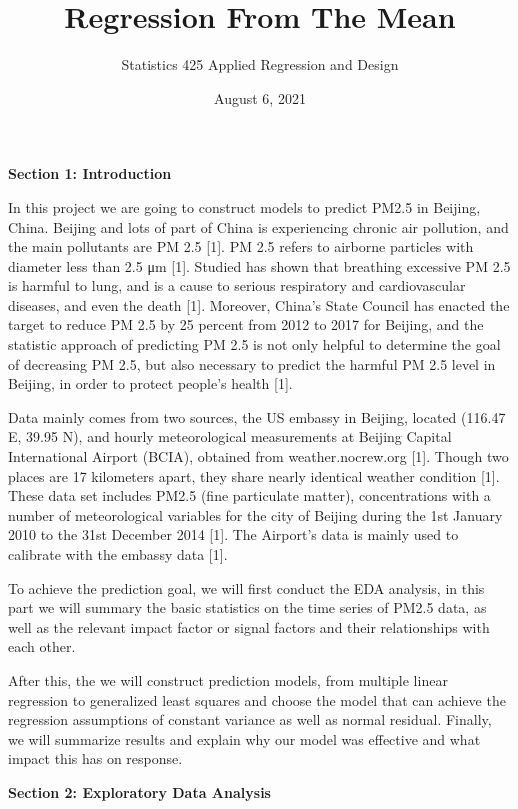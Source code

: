 \documentclass[
]{report}
\title{Regression From The Mean}
\subtitle{by

Zhengtao Xu, Jennings Cheng and Collin Carmichael}
\author{Statistics 425 Applied Regression and Design}
\date{August 6, 2021}
\begin{document}
\maketitle

\newpage

\textbf{Section 1: Introduction}

In this project we are going to construct models to predict PM2.5 in
Beijing, China. Beijing and lots of part of China is experiencing
chronic air pollution, and the main pollutants are PM 2.5 {[}1{]}. PM
2.5 refers to airborne particles with diameter less than 2.5 μm {[}1{]}.
Studied has shown that breathing excessive PM 2.5 is harmful to lung,
and is a cause to serious respiratory and cardiovascular diseases, and
even the death {[}1{]}. Moreover, China's State Council has enacted the
target to reduce PM 2.5 by 25 percent from 2012 to 2017 for Beijing, and
the statistic approach of predicting PM 2.5 is not only helpful to
determine the goal of decreasing PM 2.5, but also necessary to predict
the harmful PM 2.5 level in Beijing, in order to protect people's health
{[}1{]}.

Data mainly comes from two sources, the US embassy in Beijing, located
(116.47 E, 39.95 N), and hourly meteorological measurements at Beijing
Capital International Airport (BCIA), obtained from weather.nocrew.org
{[}1{]}. Though two places are 17 kilometers apart, they share nearly
identical weather condition {[}1{]}. These data set includes PM2.5 (fine
particulate matter), concentrations with a number of meteorological
variables for the city of Beijing during the 1st January 2010 to the
31st December 2014 {[}1{]}. The Airport's data is mainly used to
calibrate with the embassy data {[}1{]}.

To achieve the prediction goal, we will first conduct the EDA analysis,
in this part we will summary the basic statistics on the time series of
PM2.5 data, as well as the relevant impact factor or signal factors and
their relationships with each other.

After this, the we will construct prediction models, from multiple
linear regression to generalized least squares and choose the model that
can achieve the regression assumptions of constant variance as well as
normal residual. Finally, we will summarize results and explain why our
model was effective and what impact this has on response.

\textbf{Section 2: Exploratory Data Analysis}
\end{document}
